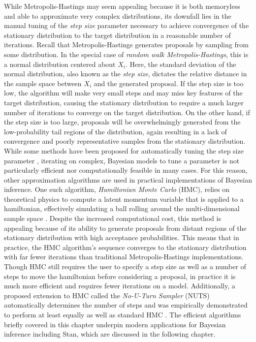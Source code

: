 \documentclass[
  12pt,
  oneside]{book}
\theoremstyle{definition}
\theoremstyle{definition}
\theoremstyle{definition}
\theoremstyle{remark}
\begin{document}
While Metropolis-Hastings may seem appealing because it is both memoryless and able to approximate very complex distributions, its downfall lies in the manual tuning of the \emph{step size} parameter necessary to achieve convergence of the stationary distribution to the target distribution in a reasonable number of iterations.
Recall that Metropolis-Hastings generates proposals by sampling from some distribution.
In the special case of \emph{random walk Metropolis-Hastings}, this is a normal distribution centered about \(X_{i}\).
Here, the standard deviation of the normal distribution, also known as the \emph{step size}, dictates the relative distance in the sample space between \(X_{i}\) and the generated proposal.
If the step size is too low, the algorithm will make very small steps and may miss key features of the target distribution, causing the stationary distribution to require a much larger number of iterations to converge on the target distribution.
On the other hand, if the step size is too large, proposals will be overwhelmingly generated from the low-probability tail regions of the distribution, again resulting in a lack of convergence and poorly representative samples from the stationary distribution.
While some methods have been proposed for automatically tuning the step size parameter \citep{Graves2011}, iterating on complex, Bayesian models to tune a parameter is not particularly efficient nor computationally feasible in many cases.
For this reason, other approximation algorithms are used in practical implementations of Bayesian inference.
One such algorithm, \emph{Hamiltonian Monte Carlo} (HMC), relies on theoretical physics to compute a latent momentum variable that is applied to a hamiltonian, effectively simulating a ball rolling around the multi-dimensional sample space \citep{Brooks2011}.
Despite the increased computational cost, this method is appealing because of its ability to generate proposals from distant regions of the stationary distribution with high acceptance probabilities.
This means that in practice, the HMC algorithm's sequence converges to the stationary distribution with far fewer iterations than traditional Metropolis-Hastings implementations.
Though HMC still requires the user to specify a step size as well as a number of steps to move the hamiltonian before considering a proposal, in practice it is much more efficient and requires fewer iterations on a model.
Additionally, a proposed extension to HMC called the \emph{No-U-Turn Sampler} (NUTS) automatically determines the number of steps and was empirically demonstrated to perform at least equally as well as standard HMC \citep{Homan2014}.
The efficient algorithms briefly covered in this chapter underpin modern applications for Bayesian inference including Stan, which are discussed in the following chapter.
\end{document}
